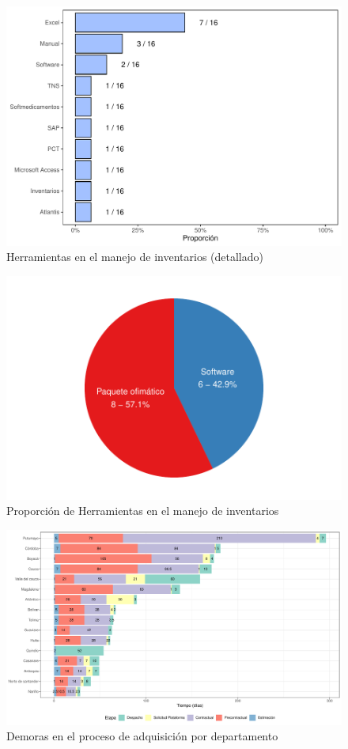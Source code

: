 \documentclass[
]{book}
\begin{document}
\begin{figure}
\includegraphics[width=0.85\linewidth]{InformeFinal_files/figure-latex/HerramientasManejoInventarios1-1} \caption{Herramientas en el manejo de inventarios (detallado)}\label{fig:HerramientasManejoInventarios1}
\end{figure}

\begin{figure}
\includegraphics[width=0.85\linewidth]{InformeFinal_files/figure-latex/PropHerramientasManejoInventarios-1} \caption{Proporción de Herramientas en el manejo de inventarios}\label{fig:PropHerramientasManejoInventarios}
\end{figure}

\begin{figure}
\includegraphics[width=1\linewidth]{InformeFinal_files/figure-latex/EtapasProcesoAdquisicion-1} \caption{Demoras en el proceso de adquisición por departamento}\label{fig:EtapasProcesoAdquisicion}
\end{figure}
\end{document}
